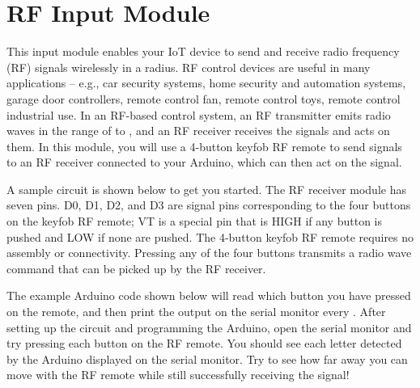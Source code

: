 
\clearpage
\section{RF Input Module}
\label{sec-input-rf}

This input module enables your IoT device to send and receive radio
frequency (RF) signals wirelessly in a  radius. RF control
devices are useful in many applications -- e.g., car security systems,
home security and automation systems, garage door controllers, remote
control fan, remote control toys, remote control industrial use. In an
RF-based control system, an RF transmitter emits radio waves in the
range of  to , and an RF receiver receives the
signals and acts on them. In this module, you will use a 4-button keyfob
RF remote to send  signals to an RF receiver connected to
your Arduino, which can then act on the signal.

A sample circuit is shown below to get you started. The RF receiver
module has seven pins. D0, D1, D2, and D3 are signal pins corresponding
to the four buttons on the keyfob RF remote; VT is a special pin that is
HIGH if any button is pushed and LOW if none are pushed. The 4-button
keyfob RF remote requires no assembly or connectivity. Pressing any of
the four buttons transmits a  radio wave command that can
be picked up by the RF receiver.

The example Arduino code shown below will read which button you have
pressed on the remote, and then print the output on the serial monitor
every . After setting up the circuit and programming the
Arduino, open the serial monitor and try pressing each button on the RF
remote. You should see each letter detected by the Arduino displayed on
the serial monitor. Try to see how far away you can move with the RF
remote while still successfully receiving the signal!

